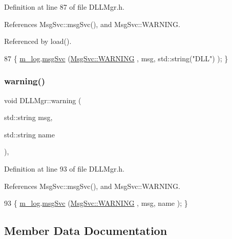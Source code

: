 Definition at line 87 of file D\+L\+L\+Mgr.\+h.



References Msg\+Svc\+::msg\+Svc(), and Msg\+Svc\+::\+W\+A\+R\+N\+I\+NG.



Referenced by load().


\begin{DoxyCode}
87 \{ \hyperlink{classDLLMgr_a64b523faed64378451ee76f6fbf0800d}{m\_log}.\hyperlink{classMsgSvc_ad25f18047920cc59a314e5098259711c}{msgSvc} (\hyperlink{classMsgSvc_ae671eb7301996cd049d2da8a65925926a7cefae88f2ba26b2b05b676a383c834b}{MsgSvc::WARNING} , msg, std::string(\textcolor{stringliteral}{"DLL"}) ); \}
\end{DoxyCode}
\mbox{\label{classDLLMgr_a84fc9787ced567adb5695fc1d7c275b8}} 
\subsubsection{\texorpdfstring{warning()}{warning()}\hspace{0.1cm}{\footnotesize\ttfamily [2/2]}}
{\footnotesize\ttfamily void D\+L\+L\+Mgr\+::warning (\begin{DoxyParamCaption}\item[{std\+::string}]{msg,  }\item[{std\+::string}]{name }\end{DoxyParamCaption})\hspace{0.3cm}{\ttfamily [inline]}, {\ttfamily [private]}}



Definition at line 93 of file D\+L\+L\+Mgr.\+h.



References Msg\+Svc\+::msg\+Svc(), and Msg\+Svc\+::\+W\+A\+R\+N\+I\+NG.


\begin{DoxyCode}
93 \{ \hyperlink{classDLLMgr_a64b523faed64378451ee76f6fbf0800d}{m\_log}.\hyperlink{classMsgSvc_ad25f18047920cc59a314e5098259711c}{msgSvc} (\hyperlink{classMsgSvc_ae671eb7301996cd049d2da8a65925926a7cefae88f2ba26b2b05b676a383c834b}{MsgSvc::WARNING} , msg, name ); \}
\end{DoxyCode}


\subsection{Member Data Documentation}
\mbox{\label{classDLLMgr_a5bd713edea21d64f32aa71162bca581a}} 
